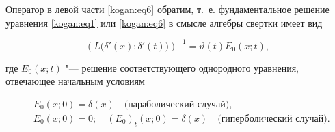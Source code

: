 \smallskip



\hypertarget{kogan:th1}{}



\begin{theorem}[1]Оператор в левой части \eqref{kogan:eq6} обратим, т.~е. фундаментальное решение уравнения \eqref{kogan:eq1} или \eqref{kogan:eq6} в смысле алгебры свертки имеет вид

\begin{equation}

\label{kogan:eq7}

\left(L\bigl(\delta'(x);\delta'(t) \bigr) \right)^{-1}=\vartheta (t)E_0 (x;t),

\end{equation}

где $E_0(x;t)$ "--- решение соответствующего однородного уравнения, отвечающее начальным условиям

\begin{equation}

\label{kogan:eq8}

\begin{aligned}

& E_0 (x;0)=\delta (x) \quad \text{$($параболический случай$)$}, \\

& E_0 (x;0)=0; \quad (E_0)_t (x;0) = \delta (x) \quad \text{$($гиперболический случай$)$}. 

\end{aligned}

\end{equation}

\end{theorem}



\smallskip



